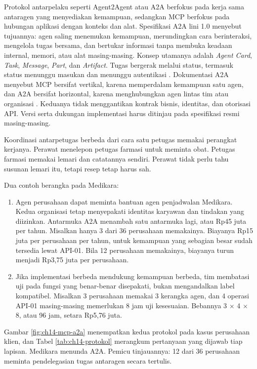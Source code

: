 Protokol antarpelaku seperti Agent2Agent atau A2A berfokus pada kerja sama antaragen yang menyediakan kemampuan, sedangkan MCP berfokus pada hubungan aplikasi dengan
konteks dan alat. Spesifikasi A2A lini 1.0 menyebut tujuannya: agen saling menemukan kemampuan, merundingkan cara berinteraksi, mengelola tugas bersama, dan bertukar
informasi tanpa membuka keadaan internal, memori, atau alat masing-masing. Konsep utamanya adalah \textit{Agent Card}, \textit{Task}, \textit{Message}, \textit{Part},
dan \textit{Artifact}. Tugas bergerak melalui status, termasuk status menunggu masukan dan menunggu autentikasi \cite{c14-a2a}. Dokumentasi A2A menyebut MCP bersifat
vertikal, karena memperdalam kemampuan satu agen, dan A2A bersifat horizontal, karena menghubungkan agen lintas tim atau organisasi \cite{c14-a2a-mcp}. Keduanya tidak
menggantikan kontrak bisnis, identitas, dan otorisasi API. Versi serta dukungan implementasi harus ditinjau pada spesifikasi resmi masing-masing.

Koordinasi antarpetugas berbeda dari cara satu petugas memakai perangkat kerjanya. Perawat menelepon petugas farmasi untuk meminta obat. Petugas farmasi memakai
lemari dan catatannya sendiri. Perawat tidak perlu tahu susunan lemari itu, tetapi resep tetap harus sah.

Dua contoh berangka pada Medikara:
\begin{enumerate}
  \item Agen perusahaan dapat meminta bantuan agen penjadwalan Medikara. Kedua organisasi tetap menyepakati identitas karyawan dan tindakan yang diizinkan. Antarmuka A2A
        menambah satu antarmuka lagi, atau Rp45 juta per tahun. Misalkan hanya 3 dari 36 perusahaan memakainya. Biayanya Rp15 juta per perusahaan per tahun, untuk kemampuan
        yang sebagian besar sudah tersedia lewat API-01. Bila 12 perusahaan memakainya, biayanya turun menjadi Rp3,75 juta per perusahaan.
  \item Jika implementasi berbeda mendukung kemampuan berbeda, tim membatasi uji pada fungsi yang benar-benar disepakati, bukan mengandalkan label kompatibel. Misalkan 3
        perusahaan memakai 3 kerangka agen, dan 4 operasi API-01 masing-masing memerlukan 8 jam uji kesesuaian. Bebannya 3 $\times$ 4 $\times$ 8, atau 96 jam, setara Rp5,76 juta.
\end{enumerate}

Gambar \ref{fig:ch14-mcp-a2a} menempatkan kedua protokol pada kasus perusahaan klien, dan Tabel \ref{tab:ch14-protokol} merangkum pertanyaan yang dijawab tiap lapisan.
Medikara menunda A2A. Pemicu tinjauannya: 12 dari 36 perusahaan meminta pendelegasian tugas antaragen secara tertulis.

